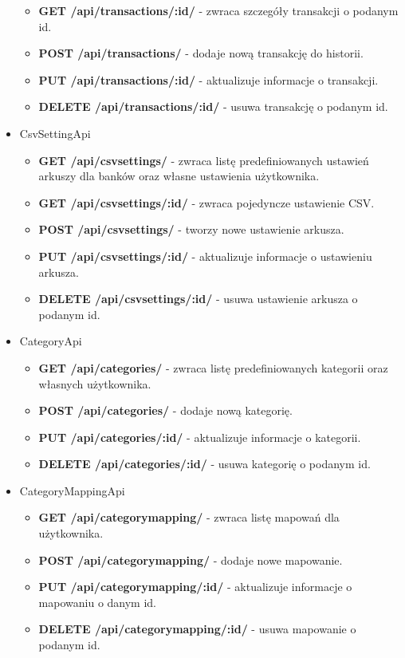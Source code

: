 \documentclass{article}
\begin{document}
\begin{itemize}
\begin{itemize}
				\item \textbf{GET /api/transactions/:id/} - zwraca szczegóły transakcji o podanym id.

				\item \textbf{POST /api/transactions/} - dodaje nową transakcję do historii.

				\item \textbf{PUT /api/transactions/:id/} - aktualizuje informacje o transakcji.

				\item \textbf{DELETE /api/transactions/:id/} - usuwa transakcję o podanym id.
			\end{itemize}
		\item CsvSettingApi
			\begin{itemize}
				\item \textbf{GET /api/csvsettings/} - zwraca listę predefiniowanych ustawień arkuszy dla banków oraz własne ustawienia użytkownika.

				\item \textbf{GET /api/csvsettings/:id/} - zwraca pojedyncze ustawienie CSV.

				\item \textbf{POST /api/csvsettings/} - tworzy nowe ustawienie arkusza.

				\item \textbf{PUT /api/csvsettings/:id/} - aktualizuje informacje o ustawieniu arkusza.

				\item \textbf{DELETE /api/csvsettings/:id/} - usuwa ustawienie arkusza o podanym id.
			\end{itemize}
		\item CategoryApi
			\begin{itemize}
				\item \textbf{GET /api/categories/} - zwraca listę predefiniowanych kategorii oraz własnych użytkownika.

				\item \textbf{POST /api/categories/} - dodaje nową kategorię.

				\item \textbf{PUT /api/categories/:id/} - aktualizuje informacje o kategorii.

				\item \textbf{DELETE /api/categories/:id/} - usuwa kategorię o podanym id.
			\end{itemize}
		\item CategoryMappingApi
			\begin{itemize}
				\item \textbf{GET /api/categorymapping/} - zwraca listę mapowań dla użytkownika.

				\item \textbf{POST /api/categorymapping/} - dodaje nowe mapowanie.

				\item \textbf{PUT /api/categorymapping/:id/} - aktualizuje informacje o mapowaniu o danym id.

				\item \textbf{DELETE /api/categorymapping/:id/} - usuwa mapowanie o podanym id.
			\end{itemize}
	\end{itemize}
\end{document}

